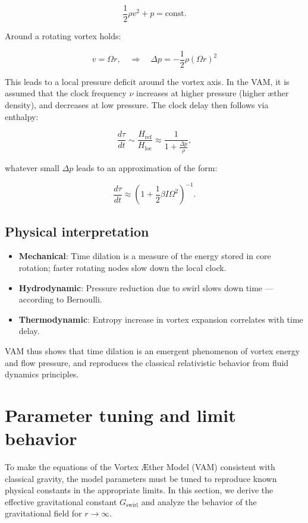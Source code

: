 \documentclass[preprint]{revtex4-2}
\begin{document}
\begin{equation}
    \frac{1}{2} \rho v^2 + p = \text{const.}
\end{equation}

Around a rotating vortex holds:

\[
    v = \Omega r, \quad \Rightarrow \quad \Delta p = -\frac{1}{2} \rho (\Omega r)^2
\]

This leads to a local pressure deficit around the vortex axis. In the VAM, it is assumed that the clock frequency $\nu$ increases at higher pressure (higher æther density), and decreases at low pressure. The clock delay then follows via enthalpy:

\begin{equation}
    \frac{d\tau}{dt} \sim \frac{H_\text{ref}}{H_\text{loc}} \approx \frac{1}{1 + \frac{\Delta p}{\rho}},
\end{equation}

whatever small $\Delta p$ leads to an approximation of the form:

\begin{equation}
    \frac{d\tau}{dt} \approx \left(1 + \frac{1}{2} \beta I \Omega^2 \right)^{-1}.
\end{equation}

\subsection{Physical interpretation}

\begin{itemize}
    \item \textbf{Mechanical}: Time dilation is a measure of the energy stored in core rotation; faster rotating nodes slow down the local clock.
    \item \textbf{Hydrodynamic}: Pressure reduction due to swirl slows down time — according to Bernoulli.
    \item \textbf{Thermodynamic}: Entropy increase in vortex expansion correlates with time delay.
\end{itemize}

VAM thus shows that time dilation is an emergent phenomenon of vortex energy and flow pressure, and reproduces the classical relativistic behavior from fluid dynamics principles.
\section{Parameter tuning and limit behavior}\label{sec:appendix:6}

To make the equations of the Vortex Æther Model (VAM) consistent with classical gravity, the model parameters must be tuned to reproduce known physical constants in the appropriate limits. In this section, we derive the effective gravitational constant $G_\text{swirl}$ and analyze the behavior of the gravitational field for $r \to \infty$.
\end{document}
